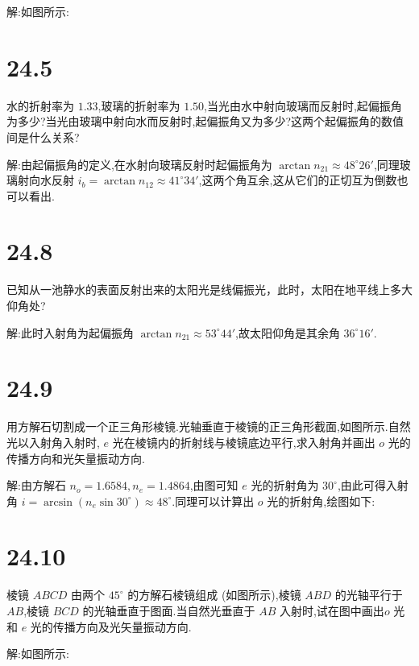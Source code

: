     解:如图所示:
    \begin{figure}[htbp]
        \centering
    \end{figure}
    \section{24.5} 水的折射率为 $1.33$,玻璃的折射率为 $1.50$,当光由水中射向玻璃而反射时,起偏振角为多少?当光由玻璃中射向水而反射时,起偏振角又为多少?这两个起偏振角的数值间是什么关系?

    解:由起偏振角的定义,在水射向玻璃反射时起偏振角为 $\arctan n_{21}\approx 48^{\circ}26'$,同理玻璃射向水反射 $i_{b}=\arctan n_{12}\approx 41^{\circ}34'$,这两个角互余,这从它们的正切互为倒数也可以看出.
    \section{24.8} 已知从一池静水的表面反射出来的太阳光是线偏振光，此时，太阳在地平线上多大仰角处?

    解:此时入射角为起偏振角 $\arctan n_{21}\approx 53^{\circ}44'$,故太阳仰角是其余角 $36^{\circ}16'$.
    \section{24.9} 用方解石切割成一个正三角形棱镜.光轴垂直于棱镜的正三角形截面,如图所示.自然光以入射角入射时, $e$ 光在棱镜内的折射线与棱镜底边平行,求入射角并画出 $o$ 光的传播方向和光矢量振动方向.

    解:由方解石 $n_{o}=1.6584,n_{e}=1.4864$,由图可知 $e$ 光的折射角为 $30^{\circ}$,由此可得入射角 $i=\arcsin\left( n_{e}\sin 30^{\circ} \right) \approx 48^{\circ}$.同理可以计算出 $o$ 光的折射角,绘图如下:
    \begin{figure}[htbp]
        \centering
    \end{figure}
    \section{24.10} 棱镜 $ABCD$ 由两个 $45^{\circ}$ 的方解石棱镜组成 (如图所示),棱镜 $ABD$ 的光轴平行于 $AB$,棱镜 $BCD$ 的光轴垂直于图面.当自然光垂直于 $AB$ 入射时,试在图中画出$o$ 光和 $e$ 光的传播方向及光矢量振动方向.

    解:如图所示:
    \begin{figure}[htbp]
        \centering
    \end{figure}
